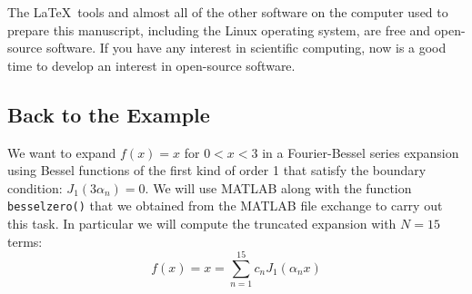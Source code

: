 The \LaTeX\ tools and almost all of the other software on the computer used to prepare this manuscript, including the Linux operating system, are free and open-source software. If you have any interest in scientific computing, now is a good time to develop an interest in open-source software.

\subsection{Back to the Example}
We want to expand $f(x)=x$ for $0<x<3$ in a Fourier-Bessel series expansion using Bessel functions of the first kind of order 1 that satisfy the boundary condition: $J_{1}(3\alpha_n)=0$.  We will use MATLAB along with the function \lstinline[style=myMatlab]{besselzero()} that we obtained from the MATLAB file exchange to carry out this task. In particular we will compute the truncated expansion with $N=15$ terms:
\begin{equation*}
f(x) = x = \sum\limits_{n=1}^{15}c_n J_1\left(\alpha_n x\right)
\end{equation*}

